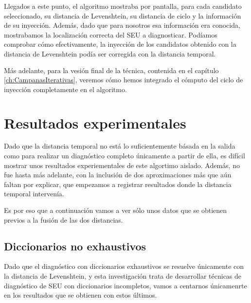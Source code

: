 Llegados a este punto, el algoritmo mostraba por pantalla, para cada candidato
seleccionado, su distancia de Levenshtein, su distancia de ciclo y la información
de su inyección. Además, dado que para nosotros esa información era conocida,
mostrabamos la localización correcta del \gls{SEU} a diagnosticar. Podíamos
comprobar cómo efectivamente, la inyección de los candidatos obtenido con la
distancia de Levenshtein podía ser corregida con la distancia temporal.

Más adelante, para la vesión final de la técnica, contenida en el capítulo
\ref{ch:CampanasIterativas}, veremos cómo hemos integrado el cómputo del ciclo de
inyección completamente en el algoritmo.

\section{Resultados experimentales}
\label{sec:CycleResults}
Dado que la distancia temporal no está lo suficientemente básada en la salida 
como para realizar un diagnóstico completo únicamente a partir de ella, es difícil
mostrar unos resultados experiementales de este algortimo aislado. Además, no fue
hasta más adelante, con la inclusión de dos aproximaciones más que aún faltan por
explicar, que empezamos a registrar resultados donde la distancia temporal 
intervenía.

Es por eso que a continuación vamos a ver sólo unos datos que se obtienen previos
a la fusión de las dos distancias.

\subsection{Diccionarios no exhaustivos}
\label{subsec:CycDicNoExhaust}
Dado que el diagnóstico con diccionarios exhaustivos se resuelve únicamente con la
distancia de Levenshtein, y esta investigación trata de desarrollar técnicas de
diagnóstico de \gls{SEU} con diccionarios incompletos, vamos a centarnos
únicamenrte en los resultados que se obtienen con estos últimos.

